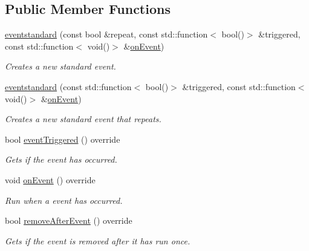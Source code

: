 \subsection*{Public Member Functions}
\begin{DoxyCompactItemize}
\item 
\hyperlink{classflounder_1_1eventstandard_a39d75790b90c11dee6a982f7ffeabebe}{eventstandard} (const bool \&repeat, const std\+::function$<$ bool()$>$ \&triggered, const std\+::function$<$ void()$>$ \&\hyperlink{classflounder_1_1eventstandard_af25e174b30e7d23698024b2c1ae9ac4c}{on\+Event})
\begin{DoxyCompactList}\small\item\em Creates a new standard event. \end{DoxyCompactList}\item 
\hyperlink{classflounder_1_1eventstandard_a63cfd71a0d3b80a18656673a651853a9}{eventstandard} (const std\+::function$<$ bool()$>$ \&triggered, const std\+::function$<$ void()$>$ \&\hyperlink{classflounder_1_1eventstandard_af25e174b30e7d23698024b2c1ae9ac4c}{on\+Event})
\begin{DoxyCompactList}\small\item\em Creates a new standard event that repeats. \end{DoxyCompactList}\item 
bool \hyperlink{classflounder_1_1eventstandard_a88224b7246627df26a08ec9e286e7496}{event\+Triggered} () override
\begin{DoxyCompactList}\small\item\em Gets if the event has occurred. \end{DoxyCompactList}\item 
void \hyperlink{classflounder_1_1eventstandard_af25e174b30e7d23698024b2c1ae9ac4c}{on\+Event} () override
\begin{DoxyCompactList}\small\item\em Run when a event has occurred. \end{DoxyCompactList}\item 
bool \hyperlink{classflounder_1_1eventstandard_ac4b9d57605f7f81c7c7e1cb981002f2f}{remove\+After\+Event} () override
\begin{DoxyCompactList}\small\item\em Gets if the event is removed after it has run once. \end{DoxyCompactList}\end{DoxyCompactItemize}
